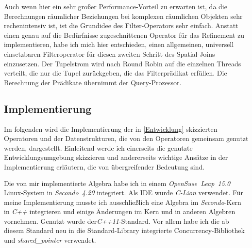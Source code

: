 \documentclass[a4paper,12pt,twoside]{article}
\newcommand{\Fb}[1]{\textit{#1}} %
\begin{document}
Auch wenn hier ein sehr großer Performance-Vorteil zu erwarten ist, da die Berechnungen räumlicher Beziehungen bei komplexen räumlichen Objekten sehr rechenintensiv ist, ist die Grundidee des Filter-Operators sehr einfach. Anstatt einen genau auf die Bedürfnisse zugeschnittenen Operator für das Refinement zu implementieren, habe ich mich hier entschieden, einen allgemeinen, universell einsetzbaren Filteroperator für diesen zweiten Schritt des Spatial-Joins einzusetzen. Der Tupelstrom wird nach Round Robin auf die einzelnen Threads verteilt, die nur die Tupel zurückgeben, die das Filterprädikat erfüllen. Die Berechnung der Prädikate übernimmt der Query-Prozessor.

\subsection{Implementierung}
\label{Implemeniterung} 

Im folgenden wird die Implementierung der in \autoref{Entwicklung} skizzierten Operatoren und der Datenstrukturen, die von den Operatoren gemeinsam genutzt werden, dargestellt. Einleitend werde ich einerseits die genutzte Entwicklungsumgebung skizzieren und andererseits wichtige Ansätze in der Implementierung erläutern, die von übergreifender Bedeutung sind.

Die von mir implementierte Algebra habe ich in einem \Fb{OpenSuse~Leap~15.0} Linux-System in \Fb{Secondo~4.20} integriert. Als IDE wurde \Fb{C-Lion} verwendet. Für meine Implementierung musste ich ausschließlich eine Algebra im \Fb{Secondo}-Kern in \Fb{C++} integrieren und einige Änderungen im Kern und in anderen Algebren vornehmen. Genutzt wurde der\Fb{C++11}-Standard. Vor allem habe ich die ab diesem Standard neu in die Standard-Library integrierte Concurrency-Bibliothek und \Fb{shared\_pointer} verwendet.
\end{document}
